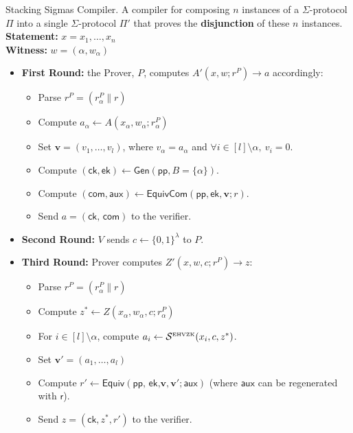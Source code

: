 \begin{protocol}[label={prot:stacksig-compiler}]{Stacking Sigmas Compiler. A compiler for composing $n$ instances of a 
  $\Sigma$-protocol $\Pi$ into a single $\Sigma$-protocol $\Pi'$ that proves the \textbf{disjunction} 
  of these $n$ instances.}
  \textbf{Statement:} $x = x_1,\ldots, x_n$ \\
  \textbf{Witness:} $w = (\alpha, w_\alpha)$
  \begin{itemize}
      \item \textbf{First Round:} the Prover, $P$, computes $A'(x,w; r^P) \rightarrow a$ accordingly:
      \begin{itemize}
          \item Parse $r^P = (r^P_\alpha \| r)$
          \item Compute $a_\alpha \leftarrow A(x_\alpha, w_\alpha; r^P_\alpha)$
          \item Set $\mathbf{v} = (v_1,\ldots, v_l)$, where $v_\alpha = a_\alpha$ and $\forall i \in [l] \setminus \alpha,\ v_i = 0$.
          \item Compute $(\textsf{ck}, \textsf{ek}) \leftarrow \textsf{Gen}(\textsf{pp}, B = \{\alpha\})$.
          \item Compute $(\textsf{com}, \textsf{aux}) \leftarrow \textsf{EquivCom}(\textsf{pp}, \textsf{ek}, \mathbf{v}; r)$.
          \item Send $a = (\textsf{ck, com})$ to the verifier. 
      \end{itemize}
      \item \textbf{Second Round:} $V$ sends $c \leftarrow \{0,1\}^\lambda$ to $P$. 
      \item \textbf{Third Round:} Prover computes $Z'(x,w,c;r^P) \rightarrow z$:
        \begin{itemize}
          \item Parse $r^P = (r^P_\alpha \| r)$
          \item Compute $z^* \leftarrow Z(x_\alpha, w_\alpha, c; r^P_\alpha)$
          \item For $i \in [l] \setminus \alpha$, compute $a_i \leftarrow \mathcal S^{\text{\tiny EHVZK}}(x_i, c, z^*)$. 
          \item Set $\mathbf{v}' = (a_1, \ldots, a_l)$
          \item Compute $r' \leftarrow \textsf{Equiv}(\textsf{pp, ek,} \mathbf{v}, \mathbf{v}'; \textsf{aux})$ (where $\textsf{aux}$ can be 
          regenerated with $\textsf{r}$).
          \item Send $z = (\textsf{ck}, z^*, r')$ to the verifier.

\end{itemize}
\end{itemize}
\end{protocol}
